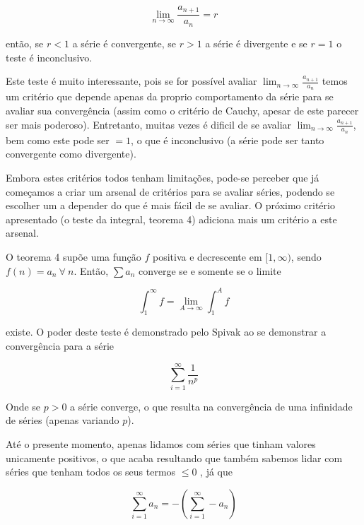 \documentclass[a4paper, 12pt]{article}
\begin{document}
\begin{equation}
 \nonumber \lim_{n\to\infty} \frac{a_{n+1}}{a_n} = r
\end{equation}

então, se $r < 1$ a série é convergente, se $r>1$ a série é divergente e se $r=1$ o teste
é inconclusivo.

Este teste é muito interessante, pois se for possível avaliar $ \lim_{n\to\infty} \frac{a_{n+1}}{a_n} $
temos um critério que depende apenas da proprio comportamento da série para se avaliar sua 
convergência (assim como o critério de Cauchy, apesar de este parecer ser mais poderoso). Entretanto, muitas vezes é dificil de se avaliar $ \lim_{n\to\infty} \frac{a_{n+1}}{a_n} $,
bem como este pode ser $=1$, o que é inconclusivo (a série pode ser tanto convergente como divergente).

Embora estes critérios todos tenham limitações, pode-se perceber que já começamos a criar um
arsenal de critérios para se avaliar séries, podendo se escolher um a depender do que é mais fácil de se
avaliar. O próximo critério apresentado (o teste da integral, teorema 4) adiciona mais um 
critério a este arsenal.

O teorema 4 supõe uma função $f$ positiva e decrescente em $[1,\infty)$, sendo $f(n) = a_n \ \forall \ n$.
Então, $\sum a_n$ converge se e somente se o limite

\begin{equation}
 \nonumber \int_1^{\infty} f = \lim_{A \to \infty}\int_{1}^A f
\end{equation}

existe. O poder deste teste é demonstrado pelo Spivak ao se demonstrar a convergência para a série

\begin{equation}
 \nonumber \sum_{i=1}^{\infty} \frac{1}{n^p}
\end{equation}

Onde se $p>0$ a série converge, o que resulta na convergência de uma infinidade de séries 
(apenas variando $p$).

Até o presente momento, apenas lidamos com séries que tinham valores unicamente positivos,
o que acaba resultando que também sabemos lidar com séries que tenham todos os seus termos $\leq 0$
, já que

\begin{equation}
 \nonumber \sum_{i=1}^{\infty} a_n = -(\sum_{i=1}^{\infty} - a_n )
\end{equation}
\end{document}
